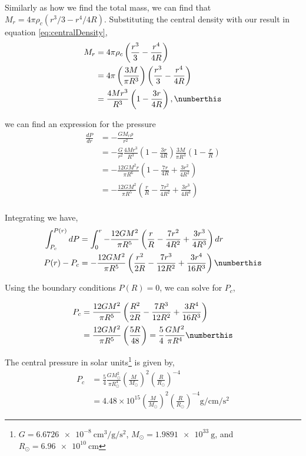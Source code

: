 Similarly as how we find the total mass, we can find that $M_r=4\pi\rho_c(r^3/3 - r^4/4R)$.
Substituting the central density with our result in equation \ref{eq:centralDensity},
\begin{align*}
    M_r&= 4\pi\rho_c\left(\frac{r^3}{3} - \frac{r^4}{4R}\right)\\
    &= 4\pi \left(\frac{3M}{\pi R^3}\right)\left(\frac{r^3}{3} - \frac{r^4}{4R}\right)\\
    &= \frac{4Mr^3}{R^3}\left(1-\frac{3r}{4R}\right), \numberthis \label{eq:massLinearModel}
\end{align*}

we can find an expression for the pressure
\begin{align*}
    \frac{dP}{dr} &= -\frac{GM_r\rho}{r^2} \\
     &=-\frac{G}{r^2}\frac{4Mr^3}{R^3}\left(1-\frac{3r}{4R}\right)\frac{3M}{\pi R^3}\left(1-\frac{r}{R}\right)\\
     &= -\frac{12GM^2r}{\pi R^6}\left(1-\frac{7r}{4R}+\frac{3r^2}{4R^2}\right)\\
     &=-\frac{12GM^2}{\pi R^5}\left(\frac{r}{R}-\frac{7r^2}{4R^2}+\frac{3r^3}{4R^3}\right)\\
\end{align*}

Integrating we have,
\begin{align*}
    \int^{P(r)}_{P_c}dP &= \int^{r}_0-\frac{12GM^2}{\pi R^5}\left(\frac{r}{R}-\frac{7r^2}{4R^2}+\frac{3r^3}{4R^3}\right)dr\\
    P(r) - P_c &= -\frac{12GM^2}{\pi R^5}\left(\frac{r^2}{2R}-\frac{7r^3}{12R^2}+\frac{3r^4}{16R^3}\right) \numberthis \label{eq:pressureExpanded}
\end{align*}

Using the boundary conditions $P(R)=0$, we can solve for $P_c$,

\begin{align*}
    P_c &= \frac{12GM^2}{\pi R^5}\left(\frac{R^2}{2R}-\frac{7R^3}{12R^2}+\frac{3R^4}{16R^3}\right)\\
    &= \frac{12GM^2}{\pi R^5}\left(\frac{5R}{48}\right)=\frac{5}{4}\frac{GM^2}{\pi R^4} \numberthis \label{eq:pressureCentral}\\
\end{align*}

The central pressure in solar units\footnote{ $G=\SI{6.6726e-8}{\cubic\cm\per\g\per\square\s}$, $M_\odot = \SI{1.9891e33}{\g}$, and $R_\odot = \SI{6.96e10}{\cm}$} is given by,
\begin{align*}
    P_c &= \frac{5}{4}\frac{GM_\odot^2}{\pi R_\odot^4}\left(\frac{M}{M_\odot}\right)^2\left(\frac{R}{R_\odot}\right)^{-4}\\
    &= 4.48\times 10^{15}\left(\frac{M}{M_\odot}\right)^2\left(\frac{R}{R_\odot}\right)^{-4}\si{\g\per\cm\per\square\s}
\end{align*}

